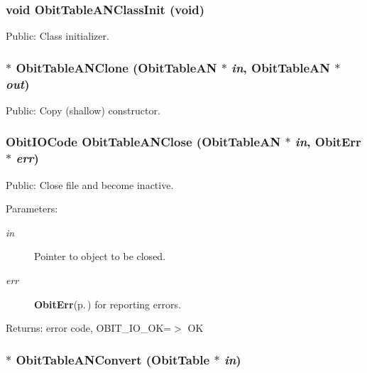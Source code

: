 \subsubsection{\setlength{\rightskip}{0pt plus 5cm}void Obit\-Table\-ANClass\-Init (void)}\label{ObitTableAN_8h_a10}


Public: Class initializer. 

\subsubsection{$\ast$ Obit\-Table\-ANClone ({\bf Obit\-Table\-AN} $\ast$ {\em in}, {\bf Obit\-Table\-AN} $\ast$ {\em out})}\label{ObitTableAN_8h_a15}


Public: Copy (shallow) constructor. 

\subsubsection{\setlength{\rightskip}{0pt plus 5cm}Obit\-IOCode Obit\-Table\-ANClose ({\bf Obit\-Table\-AN} $\ast$ {\em in}, {\bf Obit\-Err} $\ast$ {\em err})}\label{ObitTableAN_8h_a21}


Public: Close file and become inactive. 

\begin{Desc}
\item[Parameters:]
\begin{description}
\item[{\em in}]Pointer to object to be closed. \item[{\em err}]{\bf Obit\-Err}{\rm (p.\,\pageref{structObitErr})} for reporting errors. \end{description}
\end{Desc}
\begin{Desc}
\item[Returns:]error code, OBIT\_\-IO\_\-OK=$>$ OK \end{Desc}
\subsubsection{$\ast$ Obit\-Table\-ANConvert ({\bf Obit\-Table} $\ast$ {\em in})}\label{ObitTableAN_8h_a16}


